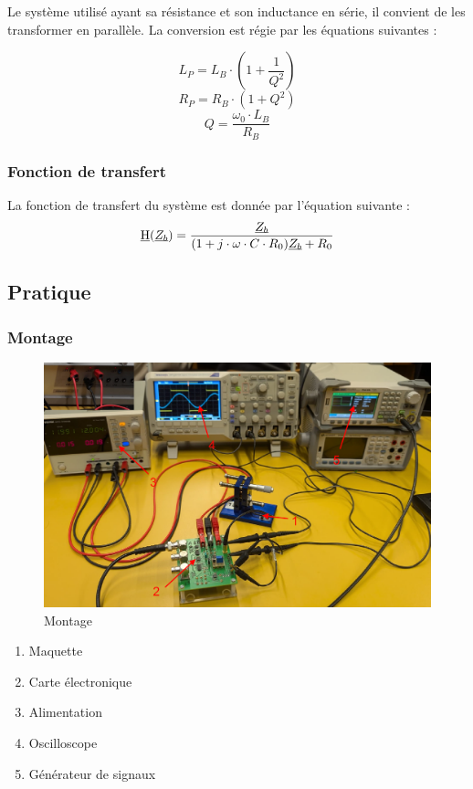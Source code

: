 Le système utilisé ayant sa résistance et son inductance en série, il convient de les transformer en
parallèle. La conversion est régie par les équations suivantes :

\begin{equation*}
L_P = L_B \cdot (1+ \frac{1}{Q^2})
\end{equation*}
\begin{equation}
    R_P = R_B \cdot (1 + Q^2)
    \label{eq:res_equi}
\end{equation}
\begin{equation}
    Q = \frac{\omega_0\cdot L_B}{R_B}
    \label{eq:quali}
\end{equation}

\subsubsection{Fonction de transfert}
La fonction de transfert du système est donnée par l'équation suivante :
\begin{equation}
    \underbar{H}(\underbar{$Z_b$}) = \frac{\underbar{$Z_b$}}{(1+j\cdot\omega \cdot C \cdot R_0)\underbar{$Z_b$}+R_0}
    \label{eq:trsf}
\end{equation}

\subsection{Pratique}
\subsubsection{Montage}
\begin{figure}[H]
    \centering
    \includegraphics[width=15cm]{Images/Seance2/Montage.png}
    \caption{Montage}
    \label{fig:montage}
\end{figure}
\begin{enumerate}
    \item Maquette
    \item Carte électronique
    \item Alimentation
    \item Oscilloscope
    \item Générateur de signaux
\end{enumerate}

